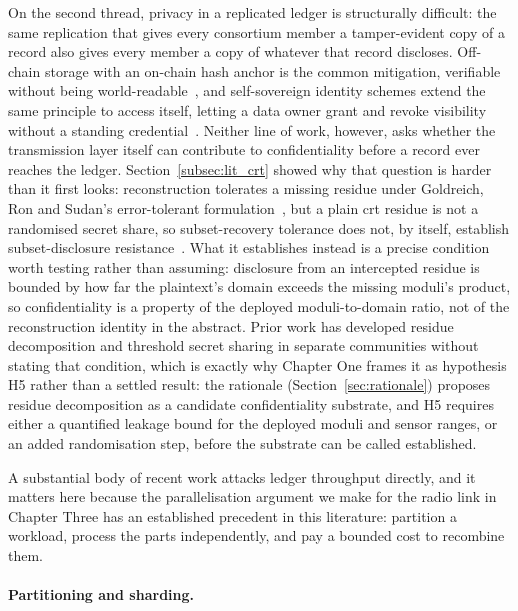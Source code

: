 On the second thread, privacy in a replicated ledger is structurally
difficult: the same replication that gives every consortium member a
tamper-evident copy of a record also gives every member a copy of whatever
that record discloses. Off-chain storage with an on-chain hash anchor is
the common mitigation, verifiable without being
world-readable~\cite{kim2023privacy}, and self-sovereign identity schemes
extend the same principle to access itself, letting a data owner grant and
revoke visibility without a standing
credential~\cite{amraouy2025ssi}. Neither line of work, however, asks
whether the transmission layer itself can contribute to confidentiality
before a record ever reaches the ledger. Section~\ref{subsec:lit_crt}
showed why that question is harder than it first looks: reconstruction
tolerates a missing residue under Goldreich, Ron and Sudan's
error-tolerant formulation~\cite{goldreich1999china}, but a plain
\gls{crt} residue is not a randomised secret share, so subset-recovery
tolerance does not, by itself, establish subset-disclosure
resistance~\cite{shoup2009computational}. What it establishes instead is
a precise condition worth testing rather than assuming: disclosure from
an intercepted residue is bounded by how far the plaintext's domain
exceeds the missing moduli's product, so confidentiality is a property of
the deployed moduli-to-domain ratio, not of the reconstruction identity
in the abstract. Prior work has developed residue decomposition and
threshold secret sharing in separate communities
without stating that condition, which is exactly why Chapter One frames
it as hypothesis H5 rather than a settled result: the rationale
(Section~\ref{sec:rationale}) proposes residue decomposition as a
candidate confidentiality substrate, and H5 requires either a quantified
leakage bound for the deployed moduli and sensor ranges, or an added
randomisation step, before the substrate can be called established.

\label{subsec:lit_scalability}

A substantial body of recent work attacks ledger throughput directly, and it
matters here because the parallelisation argument we make for the radio link
in Chapter Three has an established precedent in this literature: partition a
workload, process the parts independently, and pay a bounded cost to
recombine them.

\paragraph{Partitioning and sharding.}


